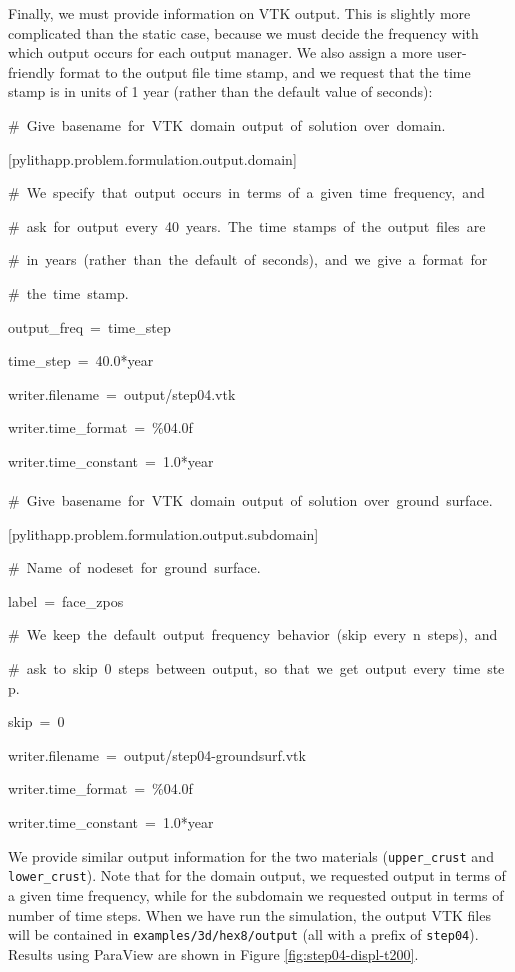 Finally, we must provide information on VTK output. This is slightly
more complicated than the static case, because we must decide the
frequency with which output occurs for each output manager. We also
assign a more user-friendly format to the output file time stamp,
and we request that the time stamp is in units of 1 year (rather than
the default value of seconds):
\begin{lyxcode}
\#~Give~basename~for~VTK~domain~output~of~solution~over~domain.

{[}pylithapp.problem.formulation.output.domain{]}

\#~We~specify~that~output~occurs~in~terms~of~a~given~time~frequency,~and

\#~ask~for~output~every~40~years.~The~time~stamps~of~the~output~files~are

\#~in~years~(rather~than~the~default~of~seconds),~and~we~give~a~format~for

\#~the~time~stamp.

output\_freq~=~time\_step

time\_step~=~40.0{*}year

writer.filename~=~output/step04.vtk

writer.time\_format~=~\%04.0f

writer.time\_constant~=~1.0{*}year~\\
~\\


\#~Give~basename~for~VTK~domain~output~of~solution~over~ground~surface.

{[}pylithapp.problem.formulation.output.subdomain{]}

\#~Name~of~nodeset~for~ground~surface.

label~=~face\_zpos

\#~We~keep~the~default~output~frequency~behavior~(skip~every~n~steps),~and

\#~ask~to~skip~0~steps~between~output,~so~that~we~get~output~every~time~step.

skip~=~0

writer.filename~=~output/step04-groundsurf.vtk

writer.time\_format~=~\%04.0f

writer.time\_constant~=~1.0{*}year
\end{lyxcode}
We provide similar output information for the two materials (\texttt{upper\_crust}
and \texttt{lower\_crust}). Note that for the domain output, we requested
output in terms of a given time frequency, while for the subdomain
we requested output in terms of number of time steps. When we have
run the simulation, the output VTK files will be contained in \texttt{examples/3d/hex8/output}
(all with a prefix of \texttt{step04}). Results using ParaView are
shown in Figure \ref{fig:step04-displ-t200}.

